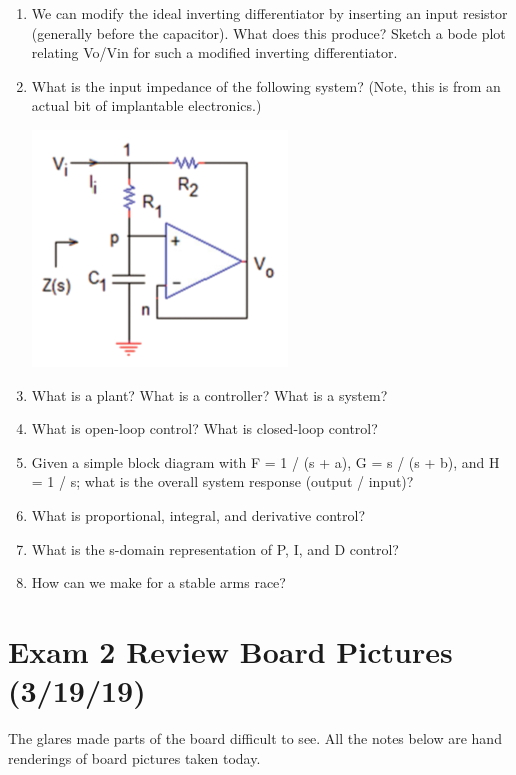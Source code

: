 \documentclass[11pt]{book}
\begin{document}
\begin{enumerate}
	\item We can modify the ideal inverting differentiator by inserting an input resistor (generally before the capacitor). What does this produce? Sketch a bode plot relating Vo/Vin for such a modified inverting differentiator.
	\item What is the input impedance of the following system? (Note, this is from an actual bit of implantable electronics.)
	\begin{center}\includegraphics{figures/q2.01.png}\end{center}
	\item What is a plant? What is a controller? What is a system?
	\item What is open-loop control? What is closed-loop control?
	\item Given a simple block diagram with F = 1 / (s + a), G = s / (s + b), and H = 1 / s; what is the overall system response (output / input)?
	\item What is proportional, integral, and derivative control?
	\item What is the s-domain representation of P, I, and D control?
	\item How can we make for a stable arms race?
\end{enumerate}

\newpage

\section{Exam 2 Review Board Pictures (3/19/19)}

The glares made parts of the board difficult to see. 
All the notes below are hand renderings of board pictures taken today.
\end{document}
